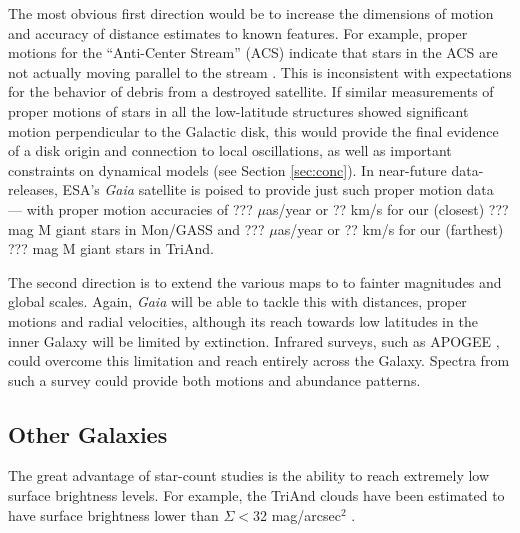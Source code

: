\documentclass[galaxies,article,submit,moreauthors,pdftex,10pt,a4paper]{mdpi}
\begin{document}
The most obvious first direction would be to increase the dimensions of motion and accuracy of distance estimates to known features.
For example,  proper motions for the ``Anti-Center Stream'' (ACS) \cite[which may or may not be part of the larger Mon/GASS structure, see ] []{li12} indicate that stars in the ACS are not actually moving parallel to the stream \cite{carlin10}. This is inconsistent with expectations for the behavior of debris from a destroyed satellite.
If similar measurements of proper motions of stars in all the low-latitude structures showed significant motion perpendicular to the Galactic disk, this would provide the final evidence of a disk origin and connection to local oscillations, as well as important constraints on dynamical models (see Section \ref{sec:conc}).
In near-future data-releases, ESA's {\it Gaia} satellite \cite{???} is poised to provide just such proper motion data --- with proper motion accuracies of ??? $\mu$as/year or ?? km/s for our (closest) ??? mag M giant stars in Mon/GASS and ??? $\mu$as/year or ?? km/s for our (farthest) ??? mag M giant stars in TriAnd.

The second direction is to extend the various maps to to fainter magnitudes and global scales. Again, {\it Gaia} will be able to tackle this with distances, proper motions and radial velocities, although its reach towards low latitudes in the inner Galaxy will be limited by extinction.
Infrared surveys, such as APOGEE \cite{apogee}, could overcome this limitation and reach entirely across the Galaxy. Spectra from such a survey could provide both motions and abundance patterns.

\subsection{Other Galaxies}

The great advantage of star-count studies is the ability to reach extremely low surface brightness levels. For example, the TriAnd clouds have been estimated to have surface brightness lower than
$\Sigma <$32 mag/arcsec$^2$ \cite{majewski04}.
\end{document}
